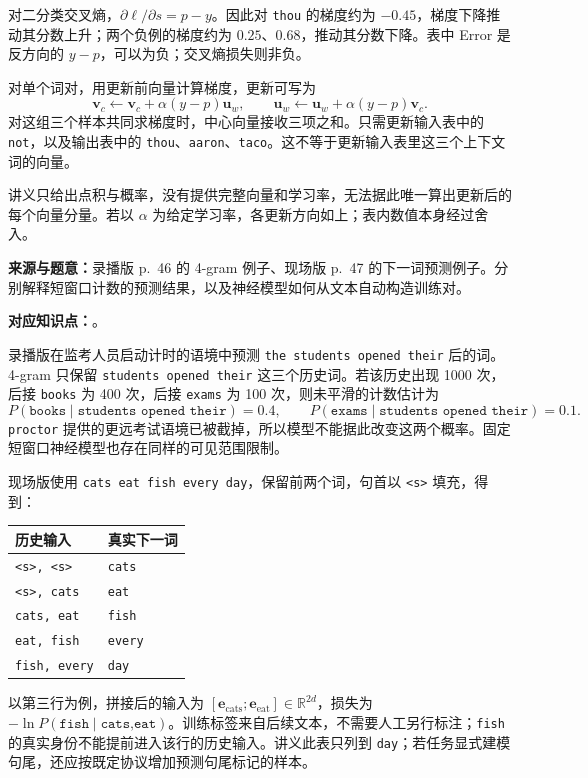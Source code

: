 \begin{workedsolution}
对二分类交叉熵，$\partial\ell/\partial s=p-y$。因此对 \texttt{thou} 的梯度约为 $-0.45$，梯度下降推动其分数上升；两个负例的梯度约为 $0.25$、$0.68$，推动其分数下降。表中 Error 是反方向的 $y-p$，可以为负；交叉熵损失则非负。

对单个词对，用更新前向量计算梯度，更新可写为
\[
 \mathbf v_c\leftarrow\mathbf v_c+\alpha(y-p)\mathbf u_w,
 \qquad
 \mathbf u_w\leftarrow\mathbf u_w+\alpha(y-p)\mathbf v_c.
\]
对这组三个样本共同求梯度时，中心向量接收三项之和。只需更新输入表中的 \texttt{not}，以及输出表中的 \texttt{thou}、\texttt{aaron}、\texttt{taco}。这不等于更新输入表里这三个上下文词的向量。

讲义只给出点积与概率，没有提供完整向量和学习率，无法据此唯一算出更新后的每个向量分量。若以 $\alpha$ 为给定学习率，各更新方向如上；表内数值本身经过舍入。
\end{workedsolution}


\textbf{来源与题意：}录播版 p.~46 的 4-gram 例子、现场版 p.~47 的下一词预测例子。分别解释短窗口计数的预测结果，以及神经模型如何从文本自动构造训练对。

\textbf{对应知识点：}。

\begin{workedsolution}
录播版在监考人员启动计时的语境中预测 \texttt{the students opened their} 后的词。4-gram 只保留 \texttt{students opened their} 这三个历史词。若该历史出现 1000 次，后接 \texttt{books} 为 400 次，后接 \texttt{exams} 为 100 次，则未平滑的计数估计为
\[
 P(\texttt{books}\mid\texttt{students opened their})=0.4,
 \qquad
 P(\texttt{exams}\mid\texttt{students opened their})=0.1.
\]
\texttt{proctor} 提供的更远考试语境已被截掉，所以模型不能据此改变这两个概率。固定短窗口神经模型也存在同样的可见范围限制。

现场版使用 \texttt{cats eat fish every day}，保留前两个词，句首以 \texttt{<s>} 填充，得到：
\begin{center}
\begin{tabular}{@{}ll@{}}
\toprule
历史输入 & 真实下一词 \\
\midrule
\texttt{<s>, <s>} & \texttt{cats} \\
\texttt{<s>, cats} & \texttt{eat} \\
\texttt{cats, eat} & \texttt{fish} \\
\texttt{eat, fish} & \texttt{every} \\
\texttt{fish, every} & \texttt{day} \\
\bottomrule
\end{tabular}
\end{center}
以第三行为例，拼接后的输入为 $[\mathbf e_{\mathrm{cats}};\mathbf e_{\mathrm{eat}}]\in\mathbb R^{2d}$，损失为 $-\ln P(\texttt{fish}\mid\texttt{cats,eat})$。训练标签来自后续文本，不需要人工另行标注；\texttt{fish} 的真实身份不能提前进入该行的历史输入。讲义此表只列到 \texttt{day}；若任务显式建模句尾，还应按既定协议增加预测句尾标记的样本。
\end{workedsolution}
